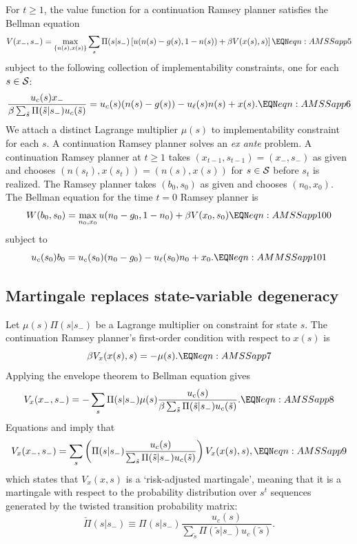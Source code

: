 For $t \geq 1$, the value function for a continuation Ramsey planner satisfies the Bellman equation
$$ V(x_-,s_-) = \max_{\{n(s), x(s)\}} \sum_s \Pi(s|s_-) \left[ u(n(s) - g(s), 1-n(s)) + \beta V(x(s),s) \right] \EQN eqn:AMSSapp5 $$
subject to the following collection of implementability constraints, one for each $s \in {\cal S}$:
$$ {\frac{u_c(s) x_- }{\beta  \sum_{\tilde s} \Pi(\tilde s|s_-) u_c(\tilde s) }} = u_c(s) (n(s) - g(s)) - u_\ell(s) n(s) + x(s) . \EQN eqn:AMSSapp6 $$
We attach a distinct  Lagrange multiplier $\mu(s)$  to implementability  constraint  for each $s$.
 A continuation  Ramsey planner solves an {\it ex ante\/} problem.  A continuation  Ramsey planner at $t \geq 1$ takes
$(x_{t-1}, s_{t-1}) = (x_-, s_-)$ as given and chooses $(n(s_t), x(s_t)) = (n(s), x(s))$ for $s \in  {\cal S}$ before $s_t$ is realized.
The Ramsey planner takes
$(b_0, s_0)$ as given and chooses $(n_0, x_0)$.
The Bellman equation for the time $t=0$ Ramsey planner is
$$ W(b_0, s_0) = \max_{n_0, x_0} u(n_0 - g_0, 1-n_0) + \beta V(x_0,s_0) \EQN eqn:AMSSapp100 $$
subject to
$$ u_{c}(s_0) b_0 = u_{c}(s_0) (n_0-g_0) - u_{\ell}(s_0) n_0 + x_0 . \EQN eqn:AMMSSapp101 $$

%


\subsection{Martingale replaces state-variable degeneracy}

Let $\mu(s) \Pi(s|s_-)$ be a Lagrange multiplier on constraint  for state $s$.  The continuation Ramsey planner's first-order condition
with respect to $x(s)$ is
$$ \beta V_x(x(s),s) = - \mu(s) .\EQN eqn:AMSSapp7  $$
Applying the envelope theorem to  Bellman equation  gives
$$ V_x(x_-,s_-) = - \sum_s \Pi(s|s_-) \mu(s) {\frac{u_c(s)}{\beta \sum_{\tilde s} \Pi(\tilde s|s_-) u_c(\tilde s) }} . \EQN eqn:AMSSapp8 $$
Equations  and  imply that
$$ V_x(x_-, s_-) = \sum_{s} \left( \Pi(s|s_-) {\frac{u_c(s)}{\sum_{\tilde s} \Pi(\tilde s| s_-) u_c(\tilde s)}} \right) V_x(x(s), s) ,\EQN eqn:AMSSapp9 $$
which states that $V_x(x, s)$ is a `risk-adjusted martingale', meaning that it is  a martingale with respect to the probability distribution over $s^t$ sequences
generated by the twisted transition probability matrix:
$$ \check \Pi(s|s_-) \equiv \Pi(s|s_-) {\frac{u_c(s)}{\sum_{\tilde s} \Pi(\tilde s| s_-) u_c(\tilde s)}}.  $$

